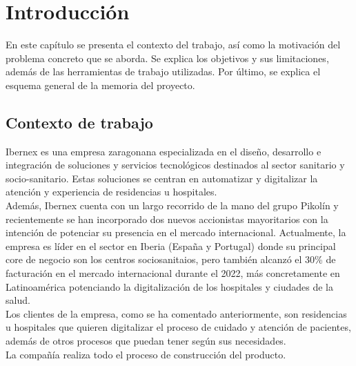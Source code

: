 \chapter{Introducción}
\label{ch:no_lineal}

En este capítulo se presenta el contexto del trabajo, así como la motivación del problema concreto que se aborda. Se explica los objetivos y sus limitaciones, además de las herramientas de trabajo utilizadas. Por último, se explica el esquema general de la memoria del proyecto.

\section{Contexto de trabajo}


 Ibernex es una empresa zaragonana especializada en el diseño, desarrollo e integración de soluciones y servicios tecnológicos destinados al sector sanitario y socio-sanitario. Estas soluciones se centran en automatizar y digitalizar la atención y experiencia de residencias u hospitales.\\

 Además, Ibernex cuenta con un largo recorrido de la mano del grupo Pikolín y recientemente se han incorporado dos nuevos accionistas mayoritarios con la intención de potenciar su presencia en el mercado internacional. Actualmente, la empresa es líder en el sector en Iberia (España y Portugal) donde su principal core de negocio son los centros sociosanitaios, pero también alcanzó el 30\% de facturación en el mercado internacional durante el 2022, más concretamente en Latinoamérica potenciando la digitalización de los hospitales y ciudades de la salud. \\

 Los clientes de la empresa, como se ha comentado anteriormente, son residencias u hospitales que quieren digitalizar el proceso de cuidado y atención de pacientes, además de otros procesos que puedan tener según sus necesidades. \\



La compañía realiza todo el proceso de construcción del producto. \\

